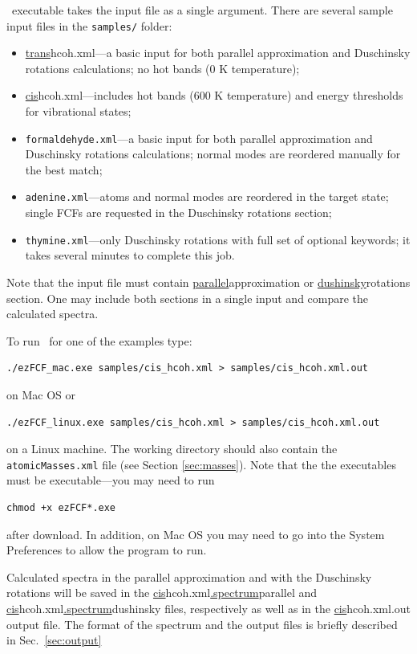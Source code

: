 \documentclass[11pt]{article}
\begin{document}
\ezFCF\ executable takes the input \xml file as a single argument. 
There are several sample input \xml files in the {\tt samples/} folder:
\begin{itemize}
\item \ul{trans}{hcoh.xml}---a basic input for both parallel approximation and Duschinsky rotations calculations; 
no hot bands (0 K temperature); 
\item \ul{cis}{hcoh.xml}---includes hot bands (600 K temperature) and energy thresholds for vibrational states;
\item {\tt formaldehyde.xml}---a basic input for both parallel approximation and Duschinsky rotations calculations;
normal modes are reordered manually for the best match;
\item {\tt adenine.xml}---atoms and normal modes are reordered in the target state; single FCFs are requested 
in the Duschinsky rotations section;
\item {\tt thymine.xml}---only Duschinsky rotations with full set of optional keywords; 
it takes several minutes to complete this job.
\end{itemize}
Note that the input file must contain \ul{parallel}{approximation} or \ul{dushinsky}{rotations} section.
One may include both sections in a single input and compare the calculated spectra.

To run \ezFCF\ for one of the examples type:
\begin{lstlisting}[frame=single,framerule=0pt]
  ./ezFCF_mac.exe samples/cis_hcoh.xml > samples/cis_hcoh.xml.out
\end{lstlisting}
on Mac OS or
\begin{lstlisting}[frame=single,framerule=0pt]
  ./ezFCF_linux.exe samples/cis_hcoh.xml > samples/cis_hcoh.xml.out
\end{lstlisting}
on a Linux machine. The working directory should also contain the {\tt atomicMasses.xml} file (see Section \ref{sec:masses}). Note that the the executables must be executable---you may need to run
\begin{lstlisting}[frame=single,framerule=0pt]
  chmod +x ezFCF*.exe
\end{lstlisting}
after download. In addition, on Mac OS you may need to go into the System Preferences to allow the program to run. 

Calculated spectra in the parallel approximation 
and with the Duschinsky rotations will be saved in the \ul{cis}{hcoh.xml}\ul{.spectrum}{parallel} and
\ul{cis}{hcoh.xml}\ul{.spectrum}{dushinsky} files, respectively as well as in the \ul{cis}{hcoh.xml.out} output file. 
The format of the spectrum and the output files is briefly described in Sec.~\ref{sec:output}
\end{document}
